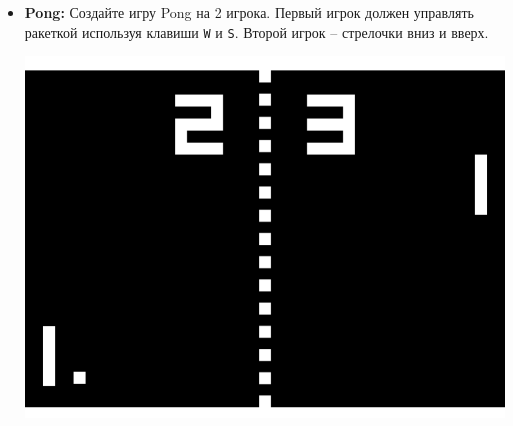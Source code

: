 \documentclass{article}
\begin{document}
\begin{itemize}
\item \textbf{Pong:} Создайте игру Pong на 2 игрока. Первый игрок должен управлять ракеткой используя клавиши \texttt{W} и \texttt{S}. Второй игрок -- стрелочки вниз и вверх.
\begin{center}
\includegraphics[scale=0.5]{../images/pong.png}
\end{center}
\end{itemize}
\end{document}
